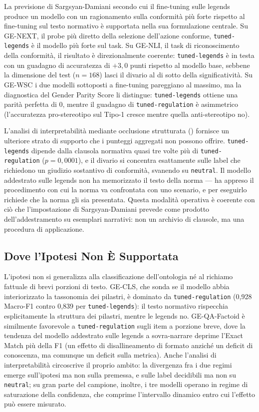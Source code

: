 \documentclass[pdflatex, sn-apa]{sn-jnl}%
\theoremstyle{thmstyleone}%
\theoremstyle{thmstyletwo}%
\theoremstyle{thmstylethree}%
\newcommand{\modellegends}{\texttt{tuned-legends}}
\newcommand{\modelreg}{\texttt{tuned-regulation}}
\begin{document}
La previsione di Sargsyan-Damiani secondo cui il fine-tuning sulle legends produce
un modello con un ragionamento sulla conformità più forte rispetto al fine-tuning
sul testo normativo è supportata nella sua formulazione centrale. Su GE-NEXT, il
probe più diretto della selezione dell'azione conforme, \modellegends{} è il
modello più forte sul task. Su GE-NLI, il task di riconoscimento della conformità,
il risultato è direzionalmente coerente: \modellegends{} è in testa con un
guadagno di accuratezza di $+3,0$ punti rispetto al modello base, sebbene la
dimensione del test ($n=168$) lasci il divario al di sotto della significatività.
Su GE-WSC i due modelli sottoposti a fine-tuning pareggiano al massimo, ma la
diagnostica del Gender Parity Score li distingue: \modellegends{} ottiene una
parità perfetta di 0, mentre il guadagno di \modelreg{} è asimmetrico
(l'accuratezza pro-stereotipo sul Tipo-1 cresce mentre quella anti-stereotipo no).

L'analisi di interpretabilità mediante occlusione strutturata ()
fornisce un ulteriore strato di supporto che i punteggi aggregati non possono
offrire. \modellegends{} dipende dalla clausola normativa quasi tre volte più di
\modelreg{} ($p = 0{,}0001$), e il divario si concentra esattamente sulle label
che richiedono un giudizio sostantivo di conformità, svanendo su
\texttt{neutral}. Il modello addestrato sulle legends non ha memorizzato il testo
della norma --- ha appreso il procedimento con cui la norma va confrontata con uno
scenario, e per eseguirlo richiede che la norma gli sia presentata. Questa
modalità operativa è coerente con ciò che l'impostazione di Sargsyan-Damiani
prevede come prodotto dell'addestramento su esemplari narrativi: non un archivio
di clausole, ma una procedura di applicazione.


\subsection{Dove l'Ipotesi Non È Supportata}
\label{sec:disc:notsupported}

L'ipotesi non si generalizza alla classificazione dell'ontologia né al richiamo
fattuale di brevi porzioni di testo. GE-CLS, che sonda se il modello abbia
interiorizzato la tassonomia dei pilastri, è dominato da \modelreg{} (0,928
Macro-F1 contro 0,839 per \modellegends): il testo normativo rispecchia
esplicitamente la struttura dei pilastri, mentre le legends no. GE-QA-Factoid è
similmente favorevole a \modelreg{} sugli item a porzione breve, dove la tendenza
del modello addestrato sulle legends a sovra-narrare deprime l'Exact Match più
della F1 (un effetto di disallineamento di formato anziché un deficit di
conoscenza, ma comunque un deficit sulla metrica). Anche l'analisi di
interpretabilità circoscrive il proprio ambito: la divergenza fra i due regimi
emerge sull'ipotesi ma non sulla premessa, e sulle label decidibili ma non su
\texttt{neutral}; su gran parte del campione, inoltre, i tre modelli operano in
regime di saturazione della confidenza, che comprime l'intervallo dinamico entro
cui l'effetto può essere misurato.
\end{document}
